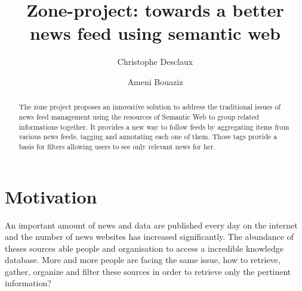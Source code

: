 \documentclass{llncs}
\begin{document}
%
\frontmatter          %
%
\pagestyle{headings}  %
%

\mainmatter              %
%
\title{Zone-project: towards a better news feed using semantic web}
%
%
\author{Christophe Desclaux\and Ameni Bouaziz }
%
%
%



\maketitle

\begin{abstract}%
The zone project proposes an innovative solution to address the traditional issues of news feed management using the resources of Semantic Web to group related informations together.
It provides a new way to follow feeds by aggregating items from various news feeds, tagging and annotating each one of them. Those tags provide a basis for filters allowing users to see only relevant news for her.

{}
\end{abstract}
%
\section{Motivation}
%
An important amount of news and data are published every day on the internet and the number of news websites has increased significantly. The abundance of theses sources able people and organisation to access a incredible knowledge database. More and more people are facing the same issue, how to retrieve, gather, organize and filter these sources in order to retrieve only the pertinent information?
\end{document}
